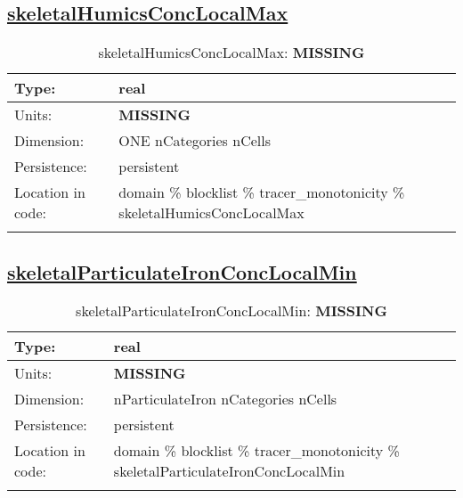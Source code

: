 \subsection[skeletalHumicsConcLocalMax]{\hyperref[sec:var_tab_tracer_monotonicity]{skeletalHumicsConcLocalMax}}
\label{subsec:var_sec_tracer_monotonicity_skeletalHumicsConcLocalMax}
\begin{center}
\begin{longtable}{| p{2.0in} | p{4.0in} |}
        \hline 
        Type: & real \\
        \hline 
        Units: & {\bf \color{red} MISSING} \\
        \hline 
        Dimension: & ONE nCategories nCells \\
        \hline 
        Persistence: & persistent \\
        \hline 
         Location in code: & domain \% blocklist \% tracer\_monotonicity \% skeletalHumicsConcLocalMax \\
         \hline 
    \caption{skeletalHumicsConcLocalMax: {\bf \color{red} MISSING}}
\end{longtable}
\end{center}
\subsection[skeletalParticulateIronConcLocalMin]{\hyperref[sec:var_tab_tracer_monotonicity]{skeletalParticulateIronConcLocalMin}}
\label{subsec:var_sec_tracer_monotonicity_skeletalParticulateIronConcLocalMin}
\begin{center}
\begin{longtable}{| p{2.0in} | p{4.0in} |}
        \hline 
        Type: & real \\
        \hline 
        Units: & {\bf \color{red} MISSING} \\
        \hline 
        Dimension: & nParticulateIron nCategories nCells \\
        \hline 
        Persistence: & persistent \\
        \hline 
         Location in code: & domain \% blocklist \% tracer\_monotonicity \% skeletalParticulateIronConcLocalMin \\
         \hline 
    \caption{skeletalParticulateIronConcLocalMin: {\bf \color{red} MISSING}}
\end{longtable}
\end{center}
